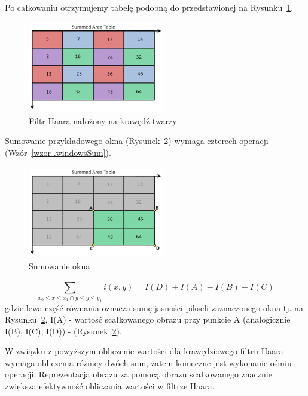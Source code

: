 \documentclass[a4paper,twoside,12pt]{book}
\begin{document}
    Po całkowaniu otrzymujemy tabelę podobną do przedstawionej na Rysunku~\ref{fig.poCalkowaniu}.
    \begin{figure}
        \centering
        \includegraphics[width=6cm]{Obrazy/poCalkowaniu.jpg}
        \caption{Filtr Haara nałożony na krawędź twarzy~\cite{integralImages}}
        \label{fig.poCalkowaniu}
    \end{figure}

    Sumowanie przykładowego okna (Rysunek~\ref{fig.sumowanieOkna}) wymaga czterech operacji (Wzór~\ref{wzor
    .windowsSum}).
    \begin{figure}
        \centering
        \includegraphics[width=6cm]{Obrazy/sumowanieOkna.jpg}
        \caption{Sumowanie okna~\cite{integralImages}}
        \label{fig.sumowanieOkna}
    \end{figure}


    \large
    \begin{equation}
        \sum_{x_0\leq x \leq x_1\cap {y}\leq y \leq y_1}^{} i(x,y) = I(D) + I(A) - I(B) - I(C)
        \label{wzor.windowsSum}
    \end{equation}
    \normalsize
    gdzie lewa część równania oznacza sumę jasności pikseli
    zaznaczonego okna tj.
    na Rysunku~\ref{fig.sumowanieOkna}, I(A) - wartość scałkowanego obrazu przy punkcie A
    (analogicznie I(B), I(C), I(D)) - (Rysunek~\ref{fig.sumowanieOkna}).

    W związku z powyższym obliczenie wartości dla krawędziowego filtru Haara wymaga obliczenia różnicy dwóch sum, zatem konieczne jest wykonanie
    ośmiu operacji.
    Reprezentacja obrazu za pomocą obrazu scałkowanego znacznie zwiększa efektywność obliczania wartości w filtrze
    Haara.
\end{document}
